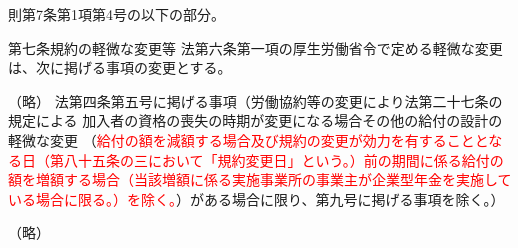 \begin{explanationbox}
  則第7条第1項第4号の以下の部分。

  \begin{lawstructure}
    \begin{lawarticle}{第七条}{規約の軽微な変更等}
      法第六条第一項の厚生労働省令で定める軽微な変更は、次に掲げる事項の変更とする。
      
      （略）
      法第四条第五号に掲げる事項（労働協約等の変更により法第二十七条の規定による
      加入者の資格の喪失の時期が変更になる場合その他の給付の設計の軽微な変更
      （\textcolor{red}{給付の額を減額する場合及び規約の変更が効力を有することとなる日（第八十五条の三において「規約変更日」という。）前の期間に係る給付の額を増額する場合（当該増額に係る実施事業所の事業主が企業型年金を実施している場合に限る。）を除く。}）がある場合に限り、第九号に掲げる事項を除く。）
      
      （略）
    \end{lawarticle}
  \end{lawstructure}
\end{explanationbox}